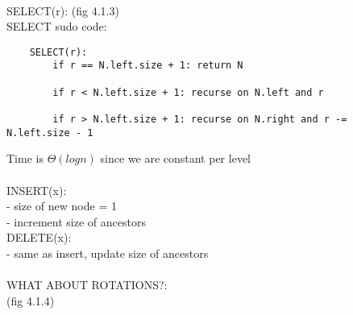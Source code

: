 \documentclass{article}
\begin{document}
	~\\
	SELECT(r): (fig 4.1.3)\\
	SELECT sudo code:
	\begin{lstlisting}
	SELECT(r):
		if r == N.left.size + 1: return N
		
		if r < N.left.size + 1: recurse on N.left and r
		
		if r > N.left.size + 1: recurse on N.right and r -= N.left.size - 1
	\end{lstlisting}
	Time is $\Theta(log n)$ since we are constant per level \\\\
	INSERT(x):\\
	- size of new node = 1\\
	- increment size of ancestors\\
	DELETE(x):\\
	- same as insert, update size of ancestors\\\\
	WHAT ABOUT ROTATIONS?:\\
	(fig 4.1.4)\\\\
	
\end{document}
